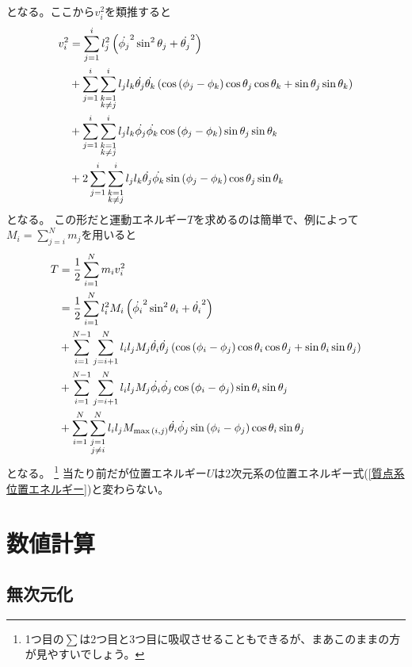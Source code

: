 \documentclass{jsarticle}
\newcommand{\eqa}[1]{\begin{align}#1\end{align}}
\newcommand{\paren}[1]{\left(#1\right)}
\newcommand{\refeq}[1]{式(\ref{#1})}
\begin{document}
となる。ここから$v^2_i$を類推すると
\eqa{
	v^2_i &= \sum_{j=1}^i l_j^2 \left(\dot{\phi_j}^2\sin^2{\theta_j} + \dot{\theta_j}^2\right) \notag\\
		&+ \sum_{j=1}^i \sum_{\substack{k=1\\ k\ne j}}^i l_j l_k \dot{\theta_j} \dot{\theta_k} \left(\cos{\left (\phi_j - \phi_k \right )} \cos{\theta_j} \cos{\theta_k} + \sin{\theta_j} \sin{\theta_k}\right) \notag\\
		&+ \sum_{j=1}^i \sum_{\substack{k=1\\ k\ne j}}^i  l_j l_k \dot{\phi_j} \dot{\phi_k} \cos{\left (\phi_j - \phi_k \right )} \sin{\theta_j} \sin{\theta_k} \notag\\
		&+ 2\sum_{j=1}^i \sum_{\substack{k=1\\ k\ne j}}^i  l_j l_k \dot{\theta_j} \dot{\phi_k} \sin{\left (\phi_j - \phi_k \right )} \cos{\theta_j} \sin{\theta_k}
}
となる。
この形だと運動エネルギー$T$を求めるのは簡単で、例によって$M_i=\sum_{j=i}^N m_j$を用いると
\eqa{
	T &= \frac{1}{2} \sum_{i=1}^N m_i v^2_i \notag\\
		&= \frac{1}{2} \sum_{i=1}^N l_i^2 M_i \left(\dot{\phi_i}^2\sin^2{\theta_i} + \dot{\theta_i}^2\right) \notag\\
		&+ \sum_{i=1}^{N-1} \sum_{j=i+1}^N l_i l_j M_j \dot{\theta_i} \dot{\theta_j} \left(\cos{\left (\phi_i - \phi_j \right )} \cos{\theta_i} \cos{\theta_j} + \sin{\theta_i} \sin{\theta_j}\right) \notag\\
		&+ \sum_{i=1}^{N-1} \sum_{j=i+1}^N  l_i l_j M_j \dot{\phi_i} \dot{\phi_j} \cos{\left (\phi_i - \phi_j \right)} \sin{\theta_i} \sin{\theta_j} \notag\\
		&+ \sum_{i=1}^N \sum_{\substack{j=1\\ j\ne i}}^N  l_i l_j M_{\max{\paren{i, j}}} \dot{\theta_i} \dot{\phi_j} \sin{\left(\phi_i - \phi_j \right)} \cos{\theta_i} \sin{\theta_j}
}
となる。
\footnote{1つ目の$\sum$は2つ目と3つ目に吸収させることもできるが、まあこのままの方が見やすいでしょう。}
当たり前だが位置エネルギー$U$は2次元系の位置エネルギー\refeq{質点系位置エネルギー}と変わらない。


\section{数値計算}

\subsection{無次元化}
\end{document}
